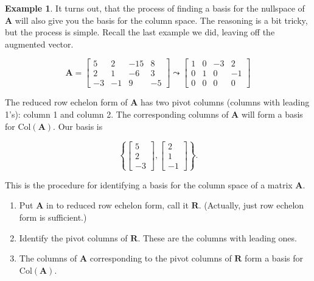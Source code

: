 \documentclass[
]{book}
\theoremstyle{definition}
\theoremstyle{definition}
\newtheorem{example}{Example}[chapter]
\theoremstyle{definition}
\theoremstyle{definition}
\theoremstyle{remark}
\begin{document}
\begin{examplebox}

\begin{example}
\protect\hypertarget{exm:colspex}{}\label{exm:colspex}It turns out, that the process of finding a basis for the nullspace of \(\mathbf{A}\) will also give you the basis for the column space. The reasoning is a bit tricky, but the process is simple. Recall the last example we did, leaving off the augmented vector.

\[\mathbf{A}=\begin{bmatrix}5 & 2 & -15 & 8 \\2 & 1 & -6 & 3\\-3 & -1 & 9 & -5\end{bmatrix}\leadsto \begin{bmatrix} 1 & 0 & -3 & 2 \\0 & 1 & 0 & -1 \\0 & 0 & 0 & 0 \end{bmatrix}\]

The reduced row echelon form of \(\mathbf{A}\) has two pivot columns (columns with leading 1's): column 1 and column 2. The corresponding columns of \(\mathbf{A}\) will form a basis for \(\text{Col}(\mathbf{A})\). Our basis is

\[\left\{\left[\begin{array}{rrr}5\\2\\-3\end{array}\right],\left[\begin{array}{rrr} 2\\1\\-1\end{array}\right]\right\}.\]
\end{example}

\end{examplebox}

This is the procedure for identifying a basis for the column space of a matrix \(\mathbf{A}\).

\begin{enumerate}
\def\labelenumi{\arabic{enumi}.}
\item
  Put \(\mathbf{A}\) in to reduced row echelon form, call it \(\mathbf{R}.\) (Actually, just row echelon form is sufficient.)
\item
  Identify the pivot columns of \(\mathbf{R}.\) These are the columns with leading ones.
\item
  The columns of \(\mathbf{A}\) corresponding to the pivot columns of \(\mathbf{R}\) form a basis for \(\text{Col}(\mathbf{A}).\)
\end{enumerate}
\end{document}

